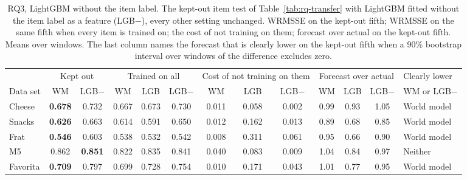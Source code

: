 \begin{table}[t]
\centering\footnotesize\setlength{\tabcolsep}{3pt}
\caption{RQ3, LightGBM without the item label. The kept-out item test of Table~\ref{tab:rq-transfer} with LightGBM fitted
without the item label as a feature (LGB$-$), every other setting unchanged. WRMSSE on the kept-out fifth; WRMSSE on the
same fifth when every item is trained on; the cost of not training on them; forecast over actual on the kept-out
fifth. Means over windows. The last column names the forecast that is clearly lower on the kept-out fifth when a 90\%
bootstrap interval over windows of the difference excludes zero.}
\label{tab:rq-noid}
\begin{adjustbox}{max width=\textwidth}\begin{tabular}{l cc ccc ccc ccc l}
\toprule
 & \multicolumn{2}{c}{Kept out} & \multicolumn{3}{c}{Trained on all} & \multicolumn{3}{c}{Cost of not training on them} & \multicolumn{3}{c}{Forecast over actual} & Clearly lower\\
\cmidrule(lr){2-3}\cmidrule(lr){4-6}\cmidrule(lr){7-9}\cmidrule(lr){10-12}
Data set & WM & LGB$-$ & WM & LGB & LGB$-$ & WM & LGB & LGB$-$ & WM & LGB & LGB$-$ & WM or LGB$-$\\
\midrule
Cheese & \cellcolor{wmcell}\textbf{0.678} & 0.732 & 0.667 & 0.673 & 0.730 & 0.011 & 0.058 & 0.002 & 0.99 & 0.93 & 1.05 & \cellcolor{wmcell}World model \\
Snacks & \cellcolor{wmcell}\textbf{0.626} & 0.663 & 0.614 & 0.591 & 0.650 & 0.012 & 0.162 & 0.013 & 0.89 & 0.68 & 0.85 & \cellcolor{wmcell}World model \\
Frat & \cellcolor{wmcell}\textbf{0.546} & 0.603 & 0.538 & 0.532 & 0.542 & 0.008 & 0.311 & 0.061 & 0.95 & 0.66 & 0.90 & \cellcolor{wmcell}World model \\
M5 & 0.862 & \cellcolor{lgbcell}\textbf{0.851} & 0.822 & 0.835 & 0.841 & 0.040 & 0.083 & 0.009 & 1.04 & 0.84 & 0.97 & Neither \\
Favorita & \cellcolor{wmcell}\textbf{0.709} & 0.797 & 0.699 & 0.728 & 0.754 & 0.010 & 0.171 & 0.043 & 1.01 & 0.77 & 0.95 & \cellcolor{wmcell}World model \\
\bottomrule
\end{tabular}\end{adjustbox}
\end{table}
